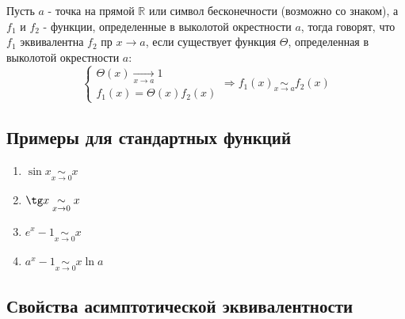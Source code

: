 \documentclass[class=article,a4paper,12pt,crop=false]{standalone}
\begin{document}
Пусть $a$ - точка на прямой $\mathbb{R}$ или символ бесконечности (возможно со знаком),
а $f_1$ и $f_2$ - функции, определенные в выколотой окрестности $a$, тогда говорят, что
$f_1$ эквивалентна $f_2$ пр  $x \rightarrow a$, если существует функция $\Theta$,
определенная в выколотой окрестности $a$:
\begin{equation}
    \begin{cases}
        \Theta(x) \underset{x \rightarrow a}{\longrightarrow} 1 \\
        f_1(x) = \Theta(x)f_2(x)
    \end{cases} \Rightarrow f_1(x) \underset{x \rightarrow a}{\sim } f_2(x)
\end{equation}

\subsection{Примеры для стандартных функций}
\begin{multicols}{2}
    \begin{enumerate}
        \item $\sin x \underset{x \rightarrow 0}{\sim} x$
        \item $\tg x \underset{x \rightarrow 0}{\sim} x$
        \item $e^x - 1 \underset{x \rightarrow 0}{\sim} x$
        \item $a^x - 1 \underset{x \rightarrow 0}{\sim} x\ln{a}$
    \end{enumerate}
\end{multicols}

\subsection{Свойства асимптотической эквивалентности}
\end{document}
